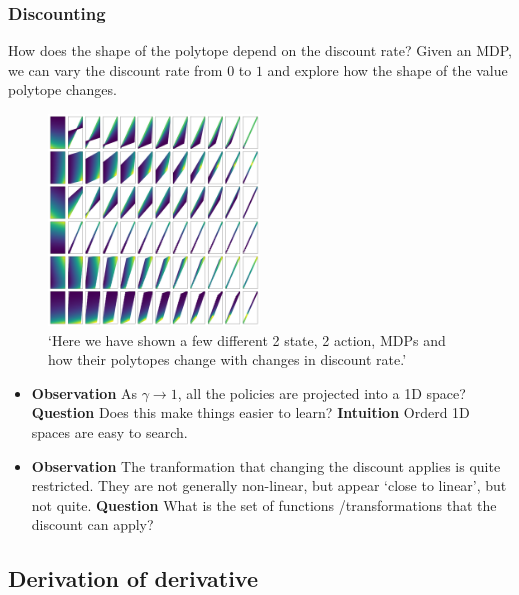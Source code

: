 \subsubsection{Discounting}

How does the shape of the polytope depend on the discount rate? Given an
MDP, we can vary the discount rate from \(0\) to \(1\) and explore how
the shape of the value polytope changes.

\begin{figure}
\centering
\includegraphics[width=0.5\textwidth,height=0.5\textheight]{../../pictures/figures/discounts.png}
\caption{`Here we have shown a few different 2 state, 2 action, MDPs and how their polytopes change with changes in discount rate.'}
\end{figure}

\begin{itemize}
\item
  \textbf{Observation} As \(\gamma \to 1\), all the policies are
  projected into a 1D space? \textbf{Question} Does this make things
  easier to learn? \textbf{Intuition} Orderd 1D spaces are easy to
  search.
\item
  \textbf{Observation} The tranformation that changing the discount
  applies is quite restricted. They are not generally non-linear, but
  appear `close to linear', but not quite. \textbf{Question} What is the
  set of functions /transformations that the discount can apply?
\end{itemize}

\subsection{Derivation of derivative}

